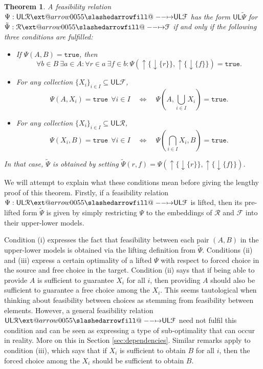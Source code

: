 \documentclass[12pt]{article}
\makeatletter
\theoremstyle{definition}
\theoremstyle{plain}
\theoremstyle{plain}
\theoremstyle{plain}
\newtheorem{theorem}[definition]{Theorem}
\theoremstyle{plain}
\theoremstyle{remark}
\theoremstyle{remark}
\newcommand{\mc}[1]{\mathcal{#1}}
\newcommand{\sub}{\subseteq}
\newcommand{\low}{\mathsf{L}}
\newcommand{\upper}{\mathsf{U}}
\newcommand{\true}{\mathtt{true}}
\newcommand{\upc}[1]{{\uparrow #1}}
\newcommand{\lwc}[1]{{\downarrow #1}}
\def\slashedarrowfill@#1#2#3#4#5{%
	$\m@th\thickmuskip0mu\medmuskip\thickmuskip\thinmuskip\thickmuskip
	\relax#5#1\mkern-7mu%
	\cleaders\hbox{$#5\mkern-2mu#2\mkern-2mu$}\hfill
	\mathclap{#3}\mathclap{#2}%
	\cleaders\hbox{$#5\mkern-2mu#2\mkern-2mu$}\hfill
	\mkern-7mu#4$%
}
\def\rightslashedarrowfill@{%
	\slashedarrowfill@\relbar\relbar\mapstochar\rightarrow}
\newcommand\xslashedrightarrow[2][]{%
	\ext@arrow 0055{\rightslashedarrowfill@}{#1}{#2}}
\makeatother
\begin{document}
\begin{theorem}\label{thm:induction}
	A feasibility relation $\Psi: \upper\low\mc{R} \xslashedrightarrow{} \upper\low\mc{F}$ has the form $\upper\low\tilde\Psi$ for $\tilde\Psi: \mc{R} \xslashedrightarrow{} \mc{F}$ if and only if the following three conditions are fulfilled:
	\begin{itemize}
	\item[(i)] If $\Psi(A,B)=\true$, then
	$$\forall b \in B \: \exists a \in A : \forall r \in a \: \exists f \in b: \Psi(\upc\{\lwc{\{r\}}\},\upc\{\lwc{\{f\}}\})=\true.$$
	\item[(ii)] For any collection $\{X_i\}_{i \in I} \sub \upper\low\mc{F}$,
	$$\Psi(A,X_i) = \true \:\: \forall i \in I \quad \Leftrightarrow \quad \Psi(A,\bigcup_{i \in I} X_i) = \true.$$
	\item[(iii)] For any collection $\{X_i\}_{i \in I} \sub \upper\low\mc{R}$,
	$$\Psi(X_i,B) = \true \:\: \forall i \in I \quad \Leftrightarrow \quad \Psi(\bigcap_{i \in I}X_i,B) = \true.$$
	\end{itemize}
	In that case, $\tilde\Psi$ is obtained by setting $\tilde\Psi(r,f) = \Psi(\upc\{\lwc{\{r\}}\},\upc\{\lwc{\{f\}}\})$.
\end{theorem}

We will attempt to explain what these conditions mean before giving the lengthy proof of this theorem. Firstly, if a feasibility relation $\Psi: \upper\low\mc{R} \xslashedrightarrow{} \upper\low\mc{F}$ is lifted, then its pre-lifted form $\tilde\Psi$ is given by simply restricting $\Psi$ to the embeddings of $\mc{R}$ and $\mc{F}$ into their upper-lower models. 

Condition (i) expresses the fact that feasibility between each pair $(A,B)$ in the upper-lower models is obtained via the lifting definition from $\tilde\Psi$. Conditions (ii) and (iii) express a certain optimality of a lifted $\Psi$ with respect to forced choice in the source and free choice in the target. Condition (ii) says that if being able to provide $A$ is sufficient to guarantee $X_i$ for all $i$, then providing $A$ should also be sufficient to guarantee a free choice among the $X_i$. This seems tautological when thinking about feasibility between choices as stemming from feasibility between elements. However, a general feasibility relation $\upper\low\mc{R} \xslashedrightarrow{} \upper\low\mc{F}$ need not fulfil this condition and can be seen as expressing a type of sub-optimality that can occur in reality. More on this in Section \ref{sec:dependencies}. Similar remarks apply to condition (iii), which says that if $X_i$ is sufficient to obtain $B$ for all $i$, then the forced choice among the $X_i$ should be sufficient to obtain $B$.
\end{document}
